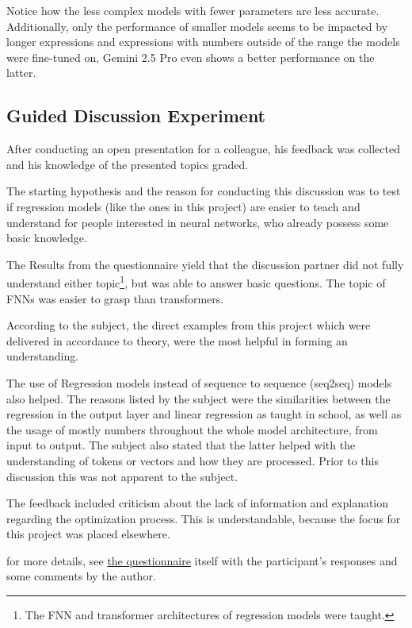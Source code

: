\documentclass{article}
\begin{document}
Notice how the less complex models with fewer parameters are less accurate. Additionally, only the performance of smaller models seems to be impacted by longer expressions and expressions with numbers outside of the range the models were fine-tuned on, Gemini 2.5 Pro even shows a better performance on the latter.


\subsection{Guided Discussion Experiment}

After conducting an open presentation for a colleague, his feedback was collected and his knowledge of the presented topics graded. 

The starting hypothesis and the reason for conducting this discussion was to test if regression models (like the ones in this project) are easier to teach and understand for people interested in neural networks, who already possess some basic knowledge.

The Results from the questionnaire yield that the discussion partner did not fully understand either topic\footnote{The FNN and transformer architectures of regression models were taught.}, but was able to answer basic questions. The topic of FNNs was easier to grasp than transformers.

According to the subject, the direct examples from this project which were delivered in accordance to theory, were the most helpful in forming an understanding. 

The use of Regression models instead of sequence to sequence (seq2seq) models also helped. The reasons listed by the subject were the similarities between the regression in the output layer and linear regression as taught in school, as well as the usage of mostly numbers throughout the whole model architecture, from input to output. The subject also stated that the latter helped with the understanding of tokens or vectors and how they are processed. Prior to this discussion this was not apparent to the subject.

The feedback included criticism about the lack of information and explanation regarding the optimization process. This is understandable, because the focus for this project was placed elsewhere.

for more details, see \href{https://github.com/AntonStantan/matura/tree/main/documentation/Questionnaire.pdf}{the questionnaire} itself with the participant's responses and some comments by the author.
\end{document}
